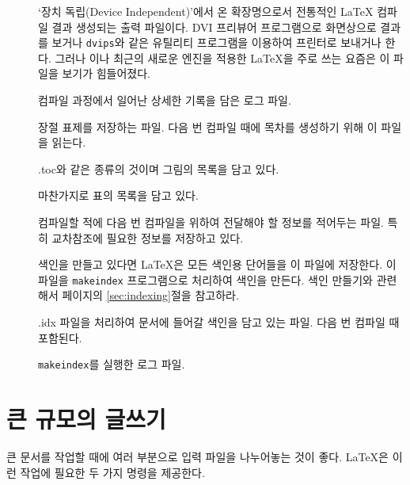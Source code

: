 \begin{description}
\item[] 
  `장치 독립(Device Independent)'에서 온 확장명으로서 전통적인 \LaTeX{} 컴파일 결과 생성되는 출력 파일이다.
  DVI 프리뷰어 프로그램으로 화면상으로 결과를 보거나 \texttt{dvips}와 같은 유틸리티 프로그램을 이용하여 
  프린터로 보내거나 한다. 그러나 이나 최근의 새로운 엔진을 적용한 \LaTeX 을 주로 쓰는
  요즘은 이 파일을 보기가 힘들어졌다. 
\item[] 
  컴파일 과정에서 일어난 상세한 기록을 담은 로그 파일.
\item[] 
  장절 표제를 저장하는 파일. 다음 번 컴파일 때에 목차를 생성하기 위해 이 파일을 읽는다.
\item[] 
  .toc와 같은 종류의 것이며 그림의 목록을 담고 있다.
\item[] 
  마찬가지로 표의 목록을 담고 있다.
\item[] 
  컴파일할 적에 다음 번 컴파일을 위하여 전달해야 할 정보를 적어두는 파일. 특히 교차참조에 필요한 
  정보를 저장하고 있다.
\item[] 
  색인을 만들고 있다면 \LaTeX 은 모든 색인용 단어들을 이 파일에 저장한다.
  이 파일을 \texttt{makeindex} 프로그램으로 처리하여 색인을 만든다. 
  색인 만들기와 관련해서 \pageref{sec:indexing}페이지의 \ref{sec:indexing}절을 참고하라.
\item[] 
  .idx 파일을 처리하여 문서에 들어갈 색인을 담고 있는 파일. 다음 번 컴파일 때 포함된다.
\item[] 
  \texttt{makeindex}를 실행한 로그 파일.
\end{description}






\section{큰 규모의 글쓰기}

큰 문서를 작업할 때에 여러 부분으로 입력 파일을 나누어놓는 것이 좋다.
\LaTeX 은 이런 작업에 필요한 두 가지 명령을 제공한다.

